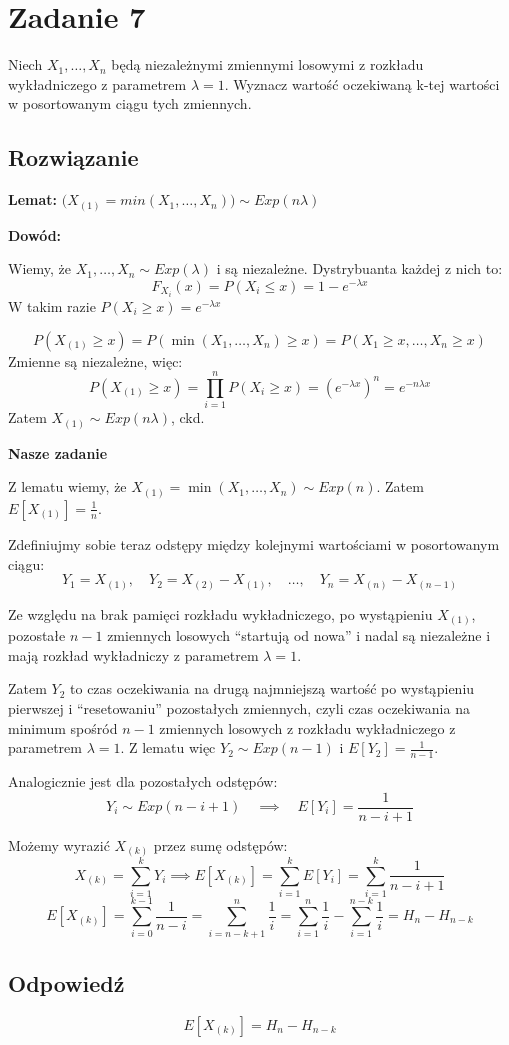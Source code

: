 \section{Zadanie 7}
Niech \(X_1, \ldots, X_n\) będą niezależnymi zmiennymi losowymi z rozkładu wykładniczego z parametrem \(\lambda = 1\).
Wyznacz wartość oczekiwaną k-tej wartości w posortowanym ciągu tych zmiennych.

\subsection*{Rozwiązanie}
\textbf{Lemat:} \(\big(X_{(1)} = min(X_1, \ldots, X_n) \big) \sim Exp(n \lambda)\)

\textbf{Dowód:}

Wiemy, że \(X_1, \ldots, X_n \sim Exp(\lambda)\) i są niezależne.
Dystrybuanta każdej z nich to: \[F_{X_i}(x) = P(X_i \leq x) = 1 - e^{-\lambda x}\]
W takim razie \(P(X_i \geq x) = e^{-\lambda x}\)

\[P(X_{(1)} \geq x) = P(\min(X_1, \ldots, X_n) \geq x) = P(X_1 \geq x, \ldots, X_n \geq x)\]
Zmienne są niezależne, więc:
\[P(X_{(1)} \geq x) = \prod_{i=1}^n P(X_i \geq x) = (e^{-\lambda x})^n = e^{-n \lambda x}\]
Zatem \(X_{(1)} \sim Exp(n \lambda)\), ckd.

\textbf{Nasze zadanie}

Z lematu wiemy, że \(X_{(1)} = \min(X_1, \ldots, X_n) \sim Exp(n)\).
Zatem \(E[X_{(1)}] = \frac{1}{n}\).

Zdefiniujmy sobie teraz odstępy między kolejnymi wartościami w posortowanym ciągu:
\[Y_1 = X_{(1)}, \quad Y_2 = X_{(2)} - X_{(1)}, \quad \ldots, \quad Y_n = X_{(n)} - X_{(n-1)}\]

Ze względu na brak pamięci rozkładu wykładniczego,
po wystąpieniu \(X_{(1)}\), pozostałe \(n-1\) zmiennych losowych
``startują od nowa'' i nadal są niezależne
i mają rozkład wykładniczy z parametrem \(\lambda = 1\).

Zatem \(Y_2\) to czas oczekiwania na drugą najmniejszą wartość po wystąpieniu pierwszej i ``resetowaniu'' pozostałych zmiennych,
czyli czas oczekiwania na minimum spośród \(n-1\) zmiennych losowych z rozkładu wykładniczego z parametrem \(\lambda = 1\).
Z lematu więc \(Y_2 \sim Exp(n-1)\) i \(E[Y_2] = \frac{1}{n-1}\).

Analogicznie jest dla pozostałych odstępów:
\[Y_i \sim Exp(n-i+1) \quad \implies \quad E[Y_i] = \frac{1}{n-i+1}\]

Możemy wyrazić \(X_{(k)}\) przez sumę odstępów:
\[X_{(k)} = \sum_{i=1}^k Y_i \implies E[X_{(k)}] = \sum_{i=1}^k E[Y_i] = \sum_{i=1}^k \frac{1}{n-i+1}\]
\[E[X_{(k)}] = \sum_{i=0}^{k-1} \frac{1}{n-i} = \sum_{i=n-k+1}^{n} \frac{1}{i} = \sum_{i=1}^n \frac{1}{i} - \sum_{i=1}^{n-k} \frac{1}{i} = H_n - H_{n-k}\]


\subsection*{Odpowiedź}
\[
	\boxed{E[X_{(k)}] = H_n - H_{n-k}}
\]

